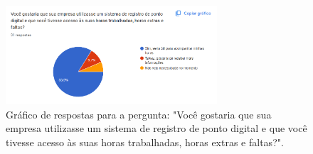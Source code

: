 \begin{apendicesenv}
\begin{figure}[h!]
  \centering
  \includegraphics[width=0.7\textwidth]{imagens/interesse-ponto.png}
  \caption{Gráfico de respostas para a pergunta: "Você gostaria que sua empresa utilizasse um sistema de registro de ponto digital e que você tivesse acesso às suas horas trabalhadas, horas extras e faltas?".}
  \label{fig:resp-func-interesse-ponto}
\end{figure}

\end{apendicesenv}
